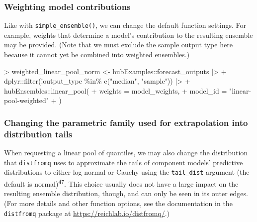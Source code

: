 \documentclass[
  letterpaper,
  DIV=11,
  numbers=noendperiod]{scrartcl}
\newenvironment{Shaded}{\begin{snugshade}}{\end{snugshade}}
\newcommand{\AttributeTok}[1]{\textcolor[rgb]{0.40,0.45,0.13}{#1}}
\newcommand{\FunctionTok}[1]{\textcolor[rgb]{0.28,0.35,0.67}{#1}}
\newcommand{\NormalTok}[1]{\textcolor[rgb]{0.00,0.23,0.31}{#1}}
\newcommand{\OtherTok}[1]{\textcolor[rgb]{0.00,0.23,0.31}{#1}}
\newcommand{\SpecialCharTok}[1]{\textcolor[rgb]{0.37,0.37,0.37}{#1}}
\newcommand{\StringTok}[1]{\textcolor[rgb]{0.13,0.47,0.30}{#1}}
\begin{document}
\subsubsection{Weighting model
contributions}\label{weighting-model-contributions-1}

Like with \texttt{simple\_ensemble()}, we can change the default
function settings. For example, weights that determine a model's
contribution to the resulting ensemble may be provided. (Note that we
must exclude the sample output type here because it cannot yet be
combined into weighted ensembles.)

\begin{Shaded}
\begin{Highlighting}[]
\SpecialCharTok{\textgreater{}}\NormalTok{ weighted\_linear\_pool\_norm }\OtherTok{\textless{}{-}}\NormalTok{ hubExamples}\SpecialCharTok{::}\NormalTok{forecast\_outputs }\SpecialCharTok{|\textgreater{}}
\SpecialCharTok{+}\NormalTok{   dplyr}\SpecialCharTok{::}\FunctionTok{filter}\NormalTok{(}\SpecialCharTok{!}\NormalTok{output\_type }\SpecialCharTok{\%in\%} \FunctionTok{c}\NormalTok{(}\StringTok{"median"}\NormalTok{, }\StringTok{"sample"}\NormalTok{)) }\SpecialCharTok{|\textgreater{}}
\SpecialCharTok{+}\NormalTok{   hubEnsembles}\SpecialCharTok{::}\FunctionTok{linear\_pool}\NormalTok{(}
\SpecialCharTok{+}     \AttributeTok{weights =}\NormalTok{ model\_weights,}
\SpecialCharTok{+}     \AttributeTok{model\_id =} \StringTok{"linear{-}pool{-}weighted"}
\SpecialCharTok{+}\NormalTok{ )}
\end{Highlighting}
\end{Shaded}

\subsubsection{Changing the parametric family used for extrapolation
into distribution
tails}\label{changing-the-parametric-family-used-for-extrapolation-into-distribution-tails}

When requesting a linear pool of quantiles, we may also change the
distribution that \texttt{distfromq} uses to approximate the tails of
component models' predictive distributions to either log normal or
Cauchy using the \texttt{tail\_dist} argument (the default is
normal)\textsuperscript{47}. This choice usually does not have a large
impact on the resulting ensemble distribution, though, and can only be
seen in its outer edges. (For more details and other function options,
see the documentation in the \texttt{distfromq} package at
\url{https://reichlab.io/distfromq/}.)
\end{document}
